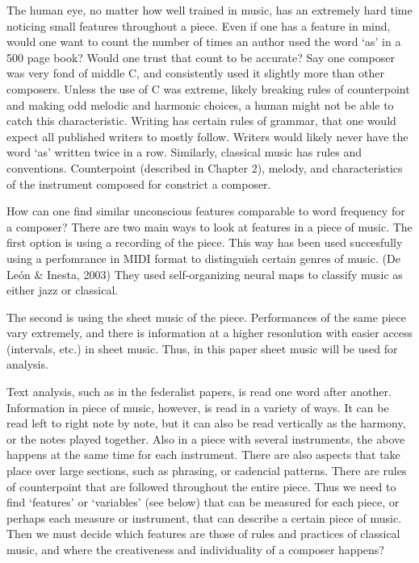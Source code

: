 \documentclass[12pt,twoside]{reedthesis}
\theoremstyle{definition}
\theoremstyle{definition}
\theoremstyle{definition}
\theoremstyle{remark}
\begin{document}
The human eye, no matter how well trained in music, has an extremely
hard time noticing small features throughout a piece. Even if one has a
feature in mind, would one want to count the number of times an author
used the word `as' in a 500 page book? Would one trust that count to be
accurate? Say one composer was very fond of middle C, and consistently
used it slightly more than other composers. Unless the use of C was
extreme, likely breaking rules of counterpoint and making odd melodic
and harmonic choices, a human might not be able to catch this
characteristic. Writing has certain rules of grammar, that one would
expect all published writers to mostly follow. Writers would likely
never have the word `as' written twice in a row. Similarly, classical
music has rules and conventions. Counterpoint (described in Chapter 2),
melody, and characteristics of the instrument composed for constrict a
composer.

How can one find similar unconscious features comparable to word
frequency for a composer? There are two main ways to look at features in
a piece of music. The first option is using a recording of the piece.
This way has been used succesfully using a perfomrance in MIDI format to
distinguish certain genres of music. (De León \& Inesta, 2003) They used
self-organizing neural maps to classify music as either jazz or
classical.

The second is using the sheet music of the piece. Performances of the
same piece vary extremely, and there is information at a higher
resonlution with easier access (intervals, etc.) in sheet music. Thus,
in this paper sheet music will be used for analysis.

Text analysis, such as in the federalist papers, is read one word after
another. Information in piece of music, however, is read in a variety of
ways. It can be read left to right note by note, but it can also be read
vertically as the harmony, or the notes played together. Also in a piece
with several instruments, the above happens at the same time for each
instrument. There are also aspects that take place over large sections,
such as phrasing, or cadencial patterns. There are rules of counterpoint
that are followed throughout the entire piece. Thus we need to find
`features' or `variables' (see below) that can be measured for each
piece, or perhaps each measure or instrument, that can describe a
certain piece of music. Then we must decide which features are those of
rules and practices of classical music, and where the creativeness and
individuality of a composer happens?
\end{document}
